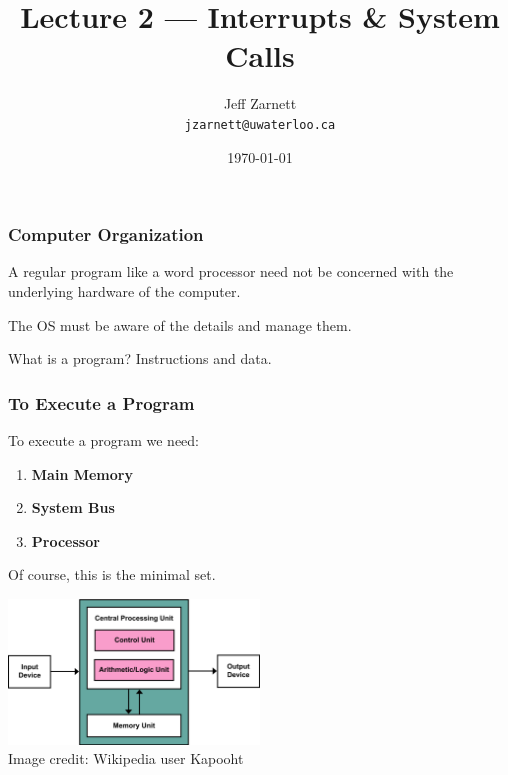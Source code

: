 

\title{Lecture 2 --- Interrupts \& System Calls }

\author{Jeff Zarnett \\ \small \texttt{jzarnett@uwaterloo.ca}}
\date{\today}




\begin{frame}
	\titlepage

\end{frame}

\begin{frame}
	\frametitle{Computer Organization}

	A regular program like a word processor need not be concerned with the underlying hardware of the computer.

	The OS must be aware of the details and manage them.

	What is a program? Instructions and data.


\end{frame}

\begin{frame}
	\frametitle{To Execute a Program}

	To execute a program we need:

	\begin{enumerate}
		\item \textbf{Main Memory}
		\item \textbf{System Bus}
		\item \textbf{Processor}
	\end{enumerate}

	Of course, this is the minimal set.

	\begin{center}
		\includegraphics[width=0.5\textwidth]{images/von-neumann}\\
		Image credit: Wikipedia user Kapooht
	\end{center}



\end{frame}


